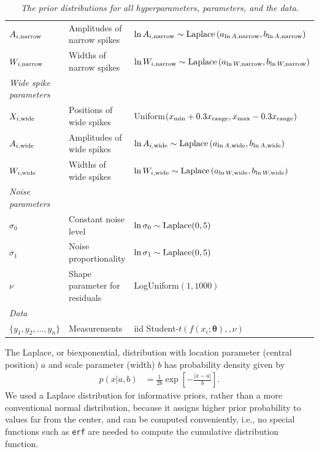 \documentclass[a4paper, 12pt]{elsarticle}
\newcommand{\params}{\boldsymbol{\theta}}
\begin{document}
\begin{landscape}
\begin{table}
\begin{tabular}{|lll|}
$A_{i, \rm narrow}$ & Amplitudes of narrow spikes &
 $\ln A_{i, \rm narrow} \sim \textnormal{Laplace}\left(a_{\ln A, \rm narrow}, b_{\ln A, \rm narrow}\right)$ \\
$W_{i, \rm narrow}$ & Widths of narrow spikes &
 $\ln W_{i, \rm narrow} \sim \textnormal{Laplace}\left(a_{\ln W, \rm narrow}, b_{\ln W, \rm narrow}\right)$ \\
\hline
{\em Wide spike parameters}&&\\
$X_{i, \rm wide}$ & Positions of wide spikes &
          Uniform$(x_{\rm min}+0.3x_{\rm range}, x_{\rm max}-0.3x_{\rm range})$ \\
$A_{i, \rm wide}$ & Amplitudes of wide spikes &
 $\ln A_{i, \rm wide} \sim \textnormal{Laplace}\left(a_{\ln A, \rm wide}, b_{\ln A, \rm wide}\right)$ \\
$W_{i, \rm wide}$ & Widths of wide spikes &
 $\ln W_{i, \rm wide} \sim \textnormal{Laplace}\left(a_{\ln W, \rm wide}, b_{\ln W, \rm wide}\right)$ \\
\hline
{\em Noise parameters}&&\\
$\sigma_0$ &    Constant noise level  &   $\ln \sigma_0 \sim \textnormal{Laplace}(0,5)$\\
$\sigma_1$ &    Noise proportionality   &  $\ln \sigma_1 \sim \textnormal{Laplace}(0,5)$ \\
$\nu$     &   Shape parameter for residuals   &   LogUniform$(1, 1000)$\\
\hline
{\em Data}&&\\
\hline
$\{y_1, y_2, ..., y_n\}$  &   Measurements    & iid Student-$t(f(x_i; \params), ,\nu)$\\
\hline
\end{tabular}
\caption{\it The prior distributions for all hyperparameters,
parameters, and the data.\label{tab:priors}}
\end{table}

\end{landscape}

The Laplace, or biexponential, distribution with location parameter
(central position) $a$ and scale parameter (width) $b$ has probability
density given by
\begin{align}
p(x | a, b) &= \frac{1}{2b}\exp\left[-\frac{|x - a|}{b}\right].
\end{align}
We used a Laplace distribution for informative priors, rather than
a more conventional normal distribution, because it assigns higher
prior probability to values far from the center, and can be computed conveniently, i.e., no special functions such as {\tt erf} are needed
to compute the cumulative distribution function.
\end{document}
